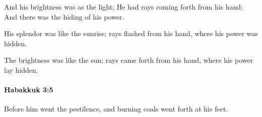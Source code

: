 			\begin{versebox}
					\item[BHS] 
					\item[LXX] 
					\item[ASV] And his brightness was as the light; He had rays coming forth from his hand; And there was the hiding of his power.
					\item[NIV] His splendor was like the sunrise; rays flashed from his hand, where his power was hidden.
					\item[NRSV] The brightness was like the sun; rays came forth from his hand, where his power lay hidden.
			\end{versebox}

		\paragraph{Habakkuk 3:5} %
			\label{HABAKKUK-3-5}

			Before him went the pestilence, and burning coals went forth at his feet.

